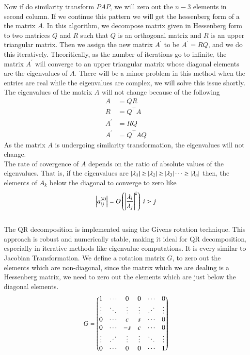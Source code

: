 \documentclass[journal]{IEEEtran}
\begin{document}
Now if do similarity transform $PAP$, we will zero out the $n-3$ elements in second column.
If we continue this pattern we will get the hessenberg form of a the matrix $A$.
In this algorithm, we decompose matrix given in Hessenberg form to two matrices $Q$ and $R$ such that $Q$ is an orthogonal matrix and $R$ is an upper triangular matrix. Then we assign the new matrix $A^\prime$ to be $A^\prime = RQ$, and we do this iteratively. Theoritically, as the number of iterations go to infinite, the matrix $A^\prime$ will converge to an upper triangular matrix whose diagonal elements are the eigenvalues of $A$. There will be a minor problem in this method when the entries are real while the eigenvalues are complex, we will solve this issue shortly. The eigenvalues of the matrix $A$ will not change because of the following
\begin{align}
	A &= QR\\
	R &= Q^\top A\\
	A^\prime &= RQ\\
	A^\prime &= Q^\top AQ
\end{align}
As the matrix $A$ is undergoing similarity transformation, the eigenvalues will not change.\\
The rate of covergence of $A$ depends on the ratio of absolute values of the eigenvalues. That is, if the eigenvalues are $\left\vert\lambda_1\right\vert \geq \left\vert\lambda_2\right\vert \geq \left\vert\lambda_3\right\vert \dots \geq \left\vert\lambda_n\right\vert$ then, the elements of $A_k$ below the diagonal to converge to zero like
\begin{align}
    \left\vert a_{ij}^{\left(k\right)}\right\vert = O\left(\left\vert\frac{\lambda_i}{\lambda_j}\right\vert^k\right)\text{    } i > j
\end{align}
\\
The QR decomposition is implemented using the Givens rotation technique. This approach is robust and numerically stable, making it ideal for QR decomposition, especially in iterative methods like eigenvalue computations. It is every similar to Jacobian Transformation. We define a rotation matrix $G$, to zero out the elements which are non-diagonal, since the matrix which we are dealing is a Hessenberg matrix, we need to zero out the elements which are just below the diagonal elements.
\begin{align}
G = \myvec{
1 & \cdots & 0 & 0 & \cdots & 0 \\
\vdots & \ddots & \vdots & \vdots & \reflectbox{$\ddots$} & \vdots \\
0 & \cdots & c & s & \cdots & 0\\
0 & \cdots & -s & c & \cdots & 0\\
\vdots & \reflectbox{$\ddots$} & \vdots & \vdots & \ddots & \vdots\\
0 & \cdots & 0 & 0 & \cdots & 1
}
\end{align}
\end{document}
